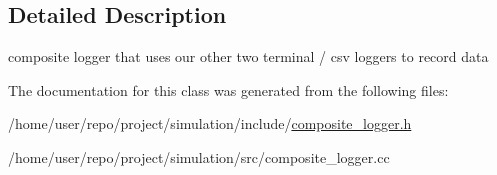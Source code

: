 \subsection{Detailed Description}
composite logger that uses our other two terminal / csv loggers to record data 

The documentation for this class was generated from the following files\+:\begin{DoxyCompactItemize}
\item 
/home/user/repo/project/simulation/include/\hyperlink{composite__logger_8h}{composite\+\_\+logger.\+h}\item 
/home/user/repo/project/simulation/src/composite\+\_\+logger.\+cc\end{DoxyCompactItemize}
